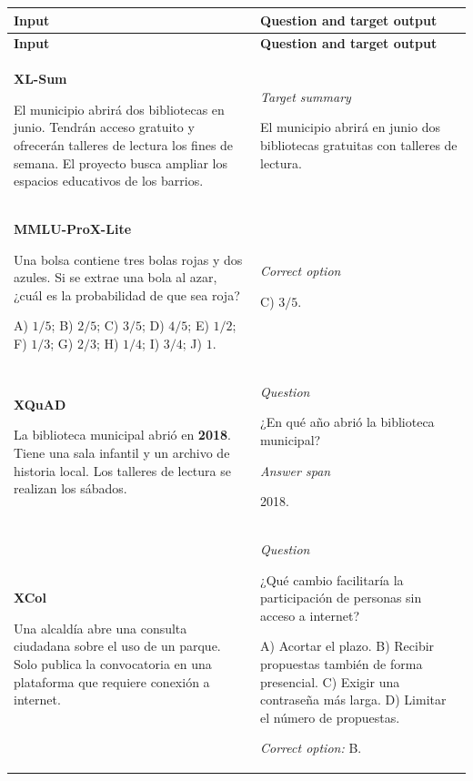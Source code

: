 \documentclass{article}
\begin{document}
\begingroup
\small
{}
\setlength{\LTleft}{0pt}
\setlength{\LTright}{0pt}
\setlength{\parskip}{4pt}
\renewcommand{\arraystretch}{1.25}
\begin{longtable}{@{}>{\raggedright\arraybackslash\setlength{\parskip}{3pt}}p{}>{\raggedright\arraybackslash\setlength{\parskip}{3pt}}p{}@{}}
\toprule
\textbf{Input} & \textbf{Question and target output} \\
\midrule
\endfirsthead
\toprule
\textbf{Input} & \textbf{Question and target output} \\
\midrule
\endhead
\bottomrule
\endfoot
\bottomrule
\endlastfoot

\textbf{XL-Sum}~\cite{XL-SUM}\par
El municipio abrirá dos bibliotecas en junio. Tendrán acceso gratuito y ofrecerán talleres de lectura los fines de semana. El proyecto busca ampliar los espacios educativos de los barrios.
&
\textit{Target summary}\par
El municipio abrirá en junio dos bibliotecas gratuitas con talleres de lectura.
\\
\midrule

\textbf{MMLU-ProX-Lite}~\cite{MMLU-ProX-Lite}\par
Una bolsa contiene tres bolas rojas y dos azules. Si se extrae una bola al azar, ¿cuál es la probabilidad de que sea roja?\par
A) \(1/5\); B) \(2/5\); C) \(3/5\); D) \(4/5\); E) \(1/2\); F) \(1/3\); G) \(2/3\); H) \(1/4\); I) \(3/4\); J) \(1\).
&
\textit{Correct option}\par
C) \(3/5\).
\\
\midrule

\textbf{XQuAD}~\cite{XQuad}\par
La biblioteca municipal abrió en \textbf{2018}. Tiene una sala infantil y un archivo de historia local. Los talleres de lectura se realizan los sábados.
&
\textit{Question}\par
¿En qué año abrió la biblioteca municipal?\par
\textit{Answer span}\par
2018.
\\
\midrule

\textbf{XCol}~\cite{XCol}\par
Una alcaldía abre una consulta ciudadana sobre el uso de un parque. Solo publica la convocatoria en una plataforma que requiere conexión a internet.
&
\textit{Question}\par
¿Qué cambio facilitaría la participación de personas sin acceso a internet?\par
A) Acortar el plazo.\newline
B) Recibir propuestas también de forma presencial.\newline
C) Exigir una contraseña más larga.\newline
D) Limitar el número de propuestas.\par
\textit{Correct option:} B.
\\
\midrule


\end{longtable}
\end{document}

